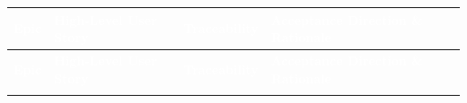 \documentclass[12pt, a4paper]{article}
\begin{document}
{\footnotesize
{}
\begin{longtable}{|>{\raggedright\arraybackslash}p{2.7cm}|>{\raggedright\arraybackslash}p{5.2cm}|>{\raggedright\arraybackslash}p{2.9cm}|>{\raggedright\arraybackslash}p{5.2cm}|}
\hline
\rowcolor{cNavy}
\textcolor{white}{\textbf{Epic}} & \textcolor{white}{\textbf{High-Level User Story}} & \textcolor{white}{\textbf{Traceability}} & \textcolor{white}{\textbf{Acceptance Direction \& Rationale}} \\
\hline
\endfirsthead
\hline
\rowcolor{cNavy}
\textcolor{white}{\textbf{Epic}} & \textcolor{white}{\textbf{High-Level User Story}} & \textcolor{white}{\textbf{Traceability}} & \textcolor{white}{\textbf{Acceptance Direction \& Rationale}} \\
\hline
\endhead
\hline
\endfoot


\end{longtable}}
\end{document}
